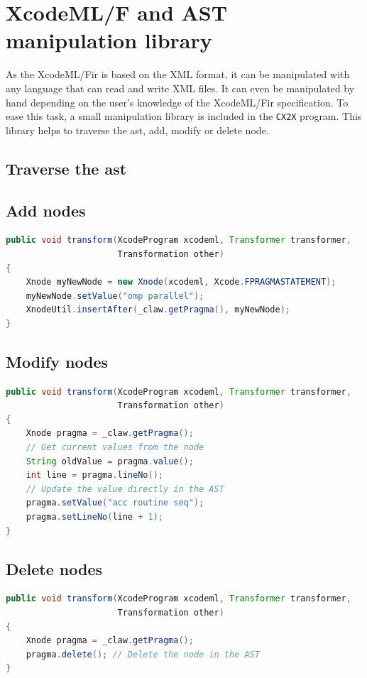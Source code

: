 \documentclass[a4paper, 11pt]{report}
\def\xcodeml{XcodeML/F\xspace}
\def\cx2x{\lstinline!CX2X!\xspace}
\newcommand{\emptypage}{}
\begin{document}
\chapter{\xcodeml and AST manipulation library}
\label{chapter:astmanip}
As the \xcodeml \gls{ir} is based on the XML format, it can be manipulated with
any language that can read and write XML files. It can even be manipulated by
hand depending on the user's knowledge of the \xcodeml \gls{ir} specification.
To ease this task, a small manipulation library is included in the \cx2x
program. This library helps to traverse the \gls{ast}, add, modify or delete
node.

\section{Traverse the \gls{ast}}

\section{Add nodes}

\begin{lstlisting}[label=lst:add_node, language=Java, caption=XcodeML/F add node example]
public void transform(XcodeProgram xcodeml, Transformer transformer,
                      Transformation other)
{
    Xnode myNewNode = new Xnode(xcodeml, Xcode.FPRAGMASTATEMENT);
    myNewNode.setValue("omp parallel");
    XnodeUtil.insertAfter(_claw.getPragma(), myNewNode);
}
\end{lstlisting}

\section{Modify nodes}

\begin{lstlisting}[label=lst:update_node, language=Java, caption=XcodeML/F update node example]
public void transform(XcodeProgram xcodeml, Transformer transformer,
                      Transformation other)
{
    Xnode pragma = _claw.getPragma();
    // Get current values from the node
    String oldValue = pragma.value();
    int line = pragma.lineNo();
    // Update the value directly in the AST
    pragma.setValue("acc routine seq");
    pragma.setLineNo(line + 1);
}
\end{lstlisting}

\section{Delete nodes}
\begin{lstlisting}[label=lst:delete_node, language=Java, caption=XcodeML/F delete node example]
public void transform(XcodeProgram xcodeml, Transformer transformer,
                      Transformation other)
{
    Xnode pragma = _claw.getPragma();
    pragma.delete(); // Delete the node in the AST
}
\end{lstlisting}


\pagebreak
\glsaddall
\printglossaries

\emptypage
\pagebreak
\listoffigures

\pagebreak
\listoftables

\emptypage
\pagebreak
\lstlistoflistings





%
\end{document}
